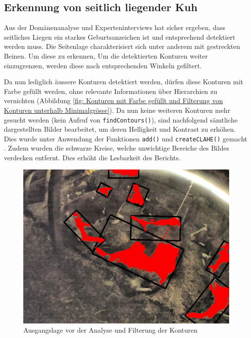 \subsection{Erkennung von seitlich liegender Kuh}
Aus der Domänenanalyse und Experteninterviews hat sicher ergeben, dass seitliches Liegen ein starkes Geburtsanzeichen ist und entsprechend detektiert werden muss. Die Seitenlage charakterisiert sich unter anderem mit gestreckten Beinen. Um diese zu erkennen, 
Um die detektierten Konturen weiter einzugrenzen, werden diese nach entsprechenden Winkeln gefiltert. 

Da nun lediglich äussere Konturen detektiert werden, dürfen diese Konturen mit Farbe gefüllt werden, ohne relevante Informationen über Hierarchien zu vernichten (Abbildung \ref{fig: Konturen mit Farbe gefüllt und Filterung von Konturen unterhalb Minimalgrösse}). Da nun keine weiteren Konturen mehr gesucht werden (kein Aufruf von \texttt{findContours()}), sind nachfolgend sämtliche dargestellten Bilder bearbeitet, um deren Helligkeit und Kontrast zu erhöhen. Dies wurde unter Anwendung der Funktionen \texttt{add()} und \texttt{createCLAHE()} gemacht . Zudem wurden die schwarze Kreise, welche unwichtige Bereiche des Bildes verdecken entfernt. Dies erhöht die Lesbarkeit des Berichts.

\begin{figure}[H]
	\center
	\includegraphics[scale=.43]{Grafiken/entwicklung/20StartImage.jpg}
	\caption{Ausgangslage vor der Analyse und Filterung der Konturen} 
	\label{fig: Ausgangslage vor der Analyse und Filterung der Konturen} 
\end{figure}

